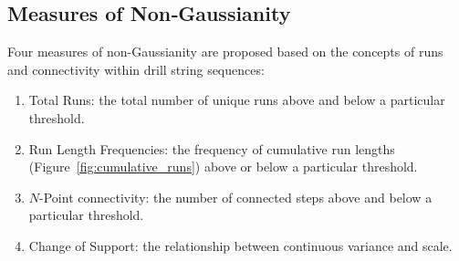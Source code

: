 \FloatBarrier
\subsection{Measures of Non‐Gaussianity}
\label{subsec:03ngmeasures}

Four measures of non-Gaussianity are proposed based on the concepts of runs and connectivity within drill string sequences:
\begin{enumerate}[noitemsep]
    \item Total Runs: the total number of unique runs above and below a particular threshold.
    \item Run Length Frequencies: the frequency of cumulative run lengths (Figure~\ref{fig:cumulative_runs}) above or below a particular threshold.
    \item $N$-Point connectivity: the number of connected steps above and below a particular threshold.
    \item Change of Support: the relationship between continuous variance and scale.
\end{enumerate}

